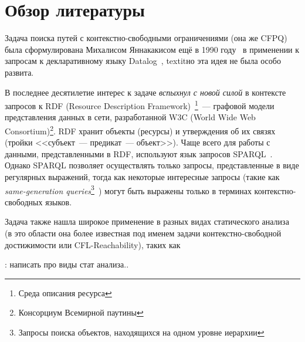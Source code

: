 \section{Обзор литературы}

Задача поиска путей с контекстно-свободными ограничениями (она же CFPQ) была сформулирована Михалисом Яннакакисом ещё в 1990 году~\cite{Yannakakis1990} в применении к запросам к декларативному языку Datalog~\cite{DatalogWiki, Ceri1989}, textit{но эта идея не была особо развита}.

В последнее десятилетие интерес к задаче \textit{вспыхнул с новой силой} в контексте запросов к RDF (Resource Description Framework)~\cite{RDF}\footnote{Среда описания ресурса}~--- графовой модели представления данных в сети, разработанной W3C (World Wide Web Consortium)\footnote{Консорциум Всемирной паутины}. RDF хранит объекты (ресурсы) и утверждения об их связях (тройки <<субъект~--- предикат~--- объект>>). Чаще всего для работы с данными, представленными в RDF, используют язык запросов SPARQL~\cite{SPARQL}. Однако SPARQL позволяет осуществлять только запросы, представленные в виде регулярных выражений, тогда как некоторые интересные запросы (такие как \textit{same-generation queries}\footnote{Запросы поиска объектов, находящихся на одном уровне иерархии}~\cite{Abiteboul1995}) могут быть выражены только в терминах контекстно-свободных языков.

Задача также нашла широкое применение в разных видах статического анализа~\cite{Reps1998} (в это области она более известная под именем задачи контекстно-свободной достижимости или CFL-Reachability), таких как 

\TODO: написать про виды стат анализа..





